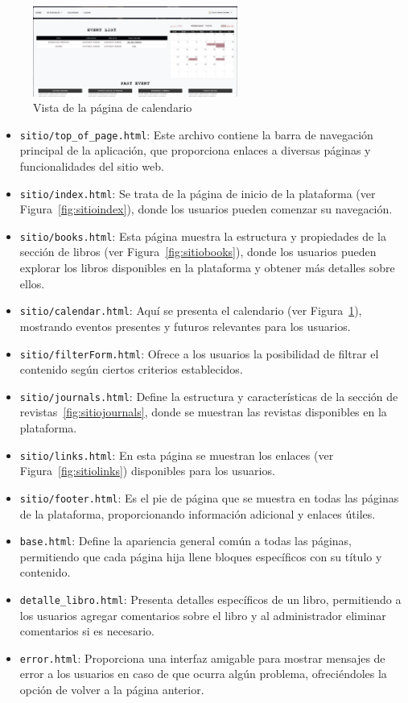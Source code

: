 \documentclass[a4paper, 12pt]{book}
\begin{document}
\begin{figure}
  \centering
  \includegraphics[width=0.6\textwidth]{img/calendarsitio.png}
  \caption{Vista de la página de calendario}
  \label{fig:sitiocalendar}
\end{figure}

\begin{itemize}
  \item \texttt{sitio/top\_of\_page.html}: Este archivo contiene la barra de navegación principal de la aplicación, que proporciona enlaces a diversas páginas y funcionalidades del sitio web.
  \item \texttt{sitio/index.html}: Se trata de la página de inicio de la plataforma (ver Figura~\ref{fig:sitioindex}), donde los usuarios pueden comenzar su navegación.
  \item \texttt{sitio/books.html}: Esta página muestra la estructura y propiedades de la sección de libros (ver Figura~\ref{fig:sitiobooks}), donde los usuarios pueden explorar los libros disponibles en la plataforma y obtener más detalles sobre ellos.
  \item \texttt{sitio/calendar.html}: Aquí se presenta el calendario (ver Figura~\ref{fig:sitiocalendar}), mostrando eventos presentes y futuros relevantes para los usuarios.
  \item \texttt{sitio/filterForm.html}: Ofrece a los usuarios la posibilidad de filtrar el contenido según ciertos criterios establecidos.
  \item \texttt{sitio/journals.html}: Define la estructura y características de la sección de revistas~\ref{fig:sitiojournals}, donde se muestran las revistas disponibles en la plataforma.
  \item \texttt{sitio/links.html}: En esta página se muestran los enlaces (ver Figura~\ref{fig:sitiolinks}) disponibles para los usuarios.
  \item \texttt{sitio/footer.html}: Es el pie de página que se muestra en todas las páginas de la plataforma, proporcionando información adicional y enlaces útiles.
  \item \texttt{base.html}: Define la apariencia general común a todas las páginas, permitiendo que cada página hija llene bloques específicos con su título y contenido.
  \item \texttt{detalle\_libro.html}: Presenta detalles específicos de un libro, permitiendo a los usuarios agregar comentarios sobre el libro y al administrador eliminar comentarios si es necesario.
  \item \texttt{error.html}: Proporciona una interfaz amigable para mostrar mensajes de error a los usuarios en caso de que ocurra algún problema, ofreciéndoles la opción de volver a la página anterior.
\end{itemize}
\end{document}
